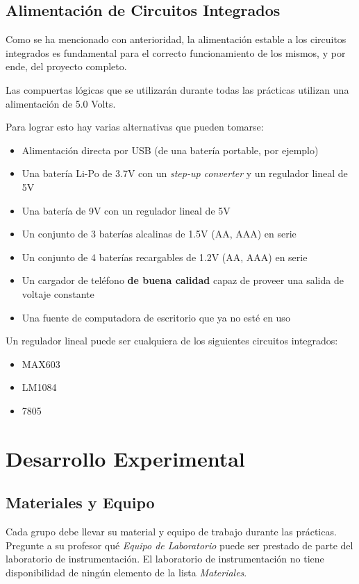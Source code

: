 \subsection{Alimentación de Circuitos Integrados}
Como se ha mencionado con anterioridad, la alimentación estable a los circuitos integrados es fundamental para el correcto funcionamiento de los mismos, y por ende, del proyecto completo.

Las compuertas lógicas que se utilizarán durante todas las prácticas utilizan una alimentación de 5.0 Volts.

Para lograr esto hay varias alternativas que pueden tomarse:
\begin{itemize}
    \item Alimentación directa por USB (de una batería portable, por ejemplo)
    \item Una batería Li-Po de 3.7V con un \emph{step-up converter} y un regulador lineal de 5V
    \item Una batería de 9V con un regulador lineal de 5V
    \item Un conjunto de 3 baterías alcalinas de 1.5V (AA, AAA) en serie
    \item Un conjunto de 4 baterías recargables de 1.2V (AA, AAA) en serie
    \item Un cargador de teléfono \textbf{de buena calidad} capaz de proveer una salida de voltaje constante
    \item Una fuente de computadora de escritorio que ya no esté en uso
\end{itemize}

Un regulador lineal puede ser cualquiera de los siguientes circuitos integrados:
\begin{itemize}
    \item MAX603
    \item LM1084
    \item 7805
\end{itemize}

\pagebreak

\section{Desarrollo Experimental}
\subsection{Materiales y Equipo}

Cada grupo debe llevar su material y equipo de trabajo durante las prácticas. Pregunte a su profesor qué \emph{Equipo de Laboratorio} puede ser prestado
de parte del laboratorio de instrumentación. El laboratorio de instrumentación no tiene disponibilidad de ningún elemento de la lista \emph{Materiales}.

